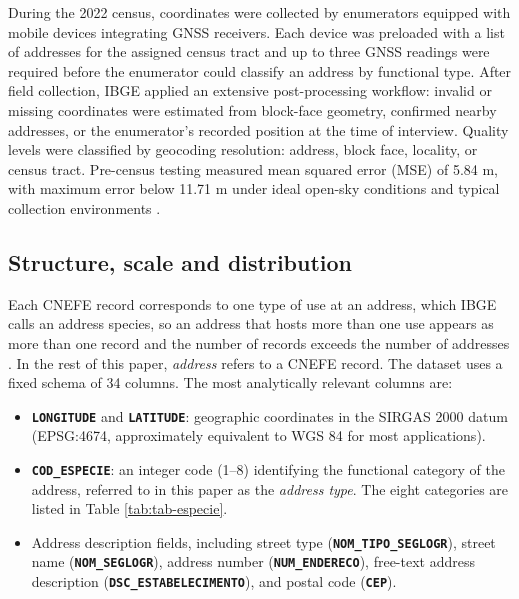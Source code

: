 During the 2022 census, coordinates were collected by enumerators
equipped with mobile devices integrating GNSS receivers. Each device was
preloaded with a list of addresses for the assigned census tract and up
to three GNSS readings were required before the enumerator could
classify an address by functional type. After field collection, IBGE
applied an extensive post-processing workflow: invalid or missing
coordinates were estimated from block-face geometry, confirmed nearby
addresses, or the enumerator's recorded position at the time of
interview. Quality levels were classified by geocoding resolution:
address, block face, locality, or census tract. Pre-census testing
measured mean squared error (MSE) of 5.84 m, with maximum error below
11.71 m under ideal open-sky conditions and typical collection
environments \citep{ibge_cnefe2024}.

\subsection{Structure, scale and distribution}\label{structure-scale-and-distribution}

Each CNEFE record corresponds to one type of use at an address, which
IBGE calls an address species, so an address that hosts more than one
use appears as more than one record
and the number of records exceeds the number of addresses
\citep{ibge_cnefe2024}. In the rest of this paper, \emph{address} refers to a
CNEFE record. The dataset uses a fixed schema of 34 columns. The most analytically relevant
columns are:

\begin{itemize}
\tightlist
\item
  \textbf{\texttt{LONGITUDE}} and \textbf{\texttt{LATITUDE}}: geographic coordinates in the
  SIRGAS 2000 datum (EPSG:4674, approximately equivalent to WGS 84 for
  most applications).
\item
  \textbf{\texttt{COD\_ESPECIE}}: an integer code (1--8) identifying the functional
  category of the address, referred to in this paper as the \emph{address
  type}. The eight categories are listed in Table
  \ref{tab:tab-especie}.
\item
  Address description fields, including street type
  (\textbf{\texttt{NOM\_TIPO\_SEGLOGR}}), street name (\textbf{\texttt{NOM\_SEGLOGR}}), address
  number (\textbf{\texttt{NUM\_ENDERECO}}), free-text address description
  (\textbf{\texttt{DSC\_ESTABELECIMENTO}}), and postal code (\textbf{\texttt{CEP}}).
\end{itemize}

